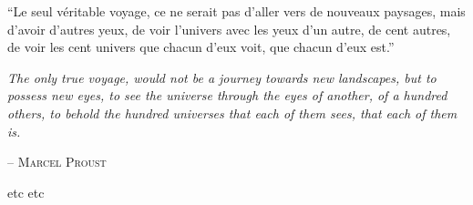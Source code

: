 
\setlength{\epigraphwidth}{0.6\textwidth}
\epigraph{``Le seul v\'{e}ritable voyage, ce ne serait pas d'aller vers de nouveaux paysages, mais d'avoir d'autres yeux, de voir l'univers avec les yeux d'un autre, de cent autres, de voir les cent univers que chacun d'eux voit, que chacun d'eux est.''

\textit{The only true voyage, would not be a journey towards new landscapes, but to possess new eyes, to see the universe through the eyes of another, of a hundred others, to behold the hundred universes that each of them sees, that each of them is.}}
            {--\; \textsc{Marcel Proust}}

 etc etc


